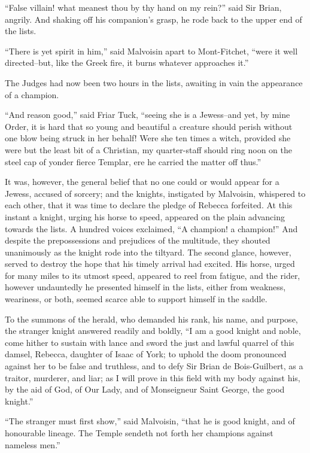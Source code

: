 ``False villain! what meanest thou by thy hand on my rein?'' said Sir
Brian, angrily. And shaking off his companion's grasp, he rode back to
the upper end of the lists.

``There is yet spirit in him,'' said Malvoisin apart to Mont-Fitchet,
``were it well directed--but, like the Greek fire, it burns whatever
approaches it.''

The Judges had now been two hours in the lists, awaiting in vain the
appearance of a champion.

``And reason good,'' said Friar Tuck, ``seeing she is a Jewess--and yet,
by mine Order, it is hard that so young and beautiful a creature should
perish without one blow being struck in her behalf! Were she ten times a
witch, provided she were but the least bit of a Christian, my
quarter-staff should ring noon on the steel cap of yonder fierce
Templar, ere he carried the matter off thus.''

It was, however, the general belief that no one could or would appear
for a Jewess, accused of sorcery; and the knights, instigated by
Malvoisin, whispered to each other, that it was time to declare the
pledge of Rebecca forfeited. At this instant a knight, urging his horse
to speed, appeared on the plain advancing towards the lists. A hundred
voices exclaimed, ``A champion! a champion!'' And despite the
prepossessions and prejudices of the multitude, they shouted unanimously
as the knight rode into the tiltyard. The second glance, however, served
to destroy the hope that his timely arrival had excited. His horse,
urged for many miles to its utmost speed, appeared to reel from fatigue,
and the rider, however undauntedly he presented himself in the lists,
either from weakness, weariness, or both, seemed scarce able to support
himself in the saddle.

To the summons of the herald, who demanded his rank, his name, and
purpose, the stranger knight answered readily and boldly, ``I am a good
knight and noble, come hither to sustain with lance and sword the just
and lawful quarrel of this damsel, Rebecca, daughter of Isaac of York;
to uphold the doom pronounced against her to be false and truthless, and
to defy Sir Brian de Bois-Guilbert, as a traitor, murderer, and liar; as
I will prove in this field with my body against his, by the aid of God,
of Our Lady, and of Monseigneur Saint George, the good knight.''

``The stranger must first show,'' said Malvoisin, ``that he is good
knight, and of honourable lineage. The Temple sendeth not forth her
champions against nameless men.''


